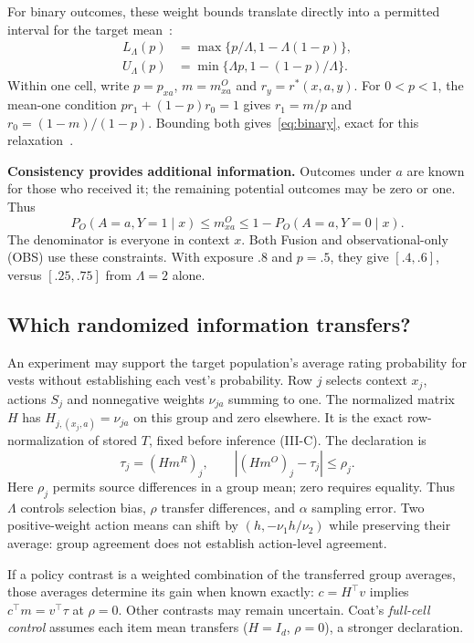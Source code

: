 \documentclass[conference]{IEEEtran}
\begin{document}
For binary outcomes, these weight bounds translate directly into a permitted interval for the target mean~\cite[Eq.~(9)]{dorn2025dvds}:
\begin{align}
 L_\Lambda(p)&=\max\{p/\Lambda,1-\Lambda(1-p)\},\nonumber\\
 U_\Lambda(p)&=\min\{\Lambda p,1-(1-p)/\Lambda\}.\label{eq:binary}
\end{align}
Within one cell, write $p=p_{xa}$, $m=m^O_{xa}$ and $r_y=r^*(x,a,y)$. For $0<p<1$, the mean-one condition $pr_1+(1-p)r_0=1$ gives $r_1=m/p$ and $r_0=(1-m)/(1-p)$. Bounding both gives~\eqref{eq:binary}, exact for this relaxation~\cite{ishikawa2026convex}.

\textbf{Consistency provides additional information.} Outcomes under $a$ are known for those who received it; the remaining potential outcomes may be zero or one. Thus
\begin{equation}
 P_O(A=a,Y=1\mid x)\le m^O_{xa}\le1-P_O(A=a,Y=0\mid x).\label{eq:consistency}
\end{equation}
The denominator is everyone in context $x$. Both Fusion and observational-only (OBS) use these constraints. With exposure $.8$ and $p=.5$, they give $[.4,.6]$, versus $[.25,.75]$ from $\Lambda=2$ alone.

\subsection{Which randomized information transfers?}
An experiment may support the target population's average rating probability for vests without establishing each vest's probability. Row $j$ selects context $x_j$, actions $S_j$ and nonnegative weights $\nu_{ja}$ summing to one. The normalized matrix $H$ has $H_{j,(x_j,a)}=\nu_{ja}$ on this group and zero elsewhere. It is the exact row-normalization of stored $T$, fixed before inference (III-C). The declaration is
\begin{equation}
 \tau_j=(Hm^R)_j,\qquad |(Hm^O)_j-\tau_j|\le\rho_j.\label{eq:transport}
\end{equation}
Here $\rho_j$ permits source differences in a group mean; zero requires equality. Thus $\Lambda$ controls selection bias, $\rho$ transfer differences, and $\alpha$ sampling error. Two positive-weight action means can shift by $(h,-\nu_1h/\nu_2)$ while preserving their average: group agreement does not establish action-level agreement.

If a policy contrast is a weighted combination of the transferred group averages, those averages determine its gain when known exactly: $c=H^\top v$ implies $c^\top m=v^\top\tau$ at $\rho=0$. Other contrasts may remain uncertain. Coat's \emph{full-cell control} assumes each item mean transfers ($H=I_d$, $\rho=0$), a stronger declaration.
\end{document}
